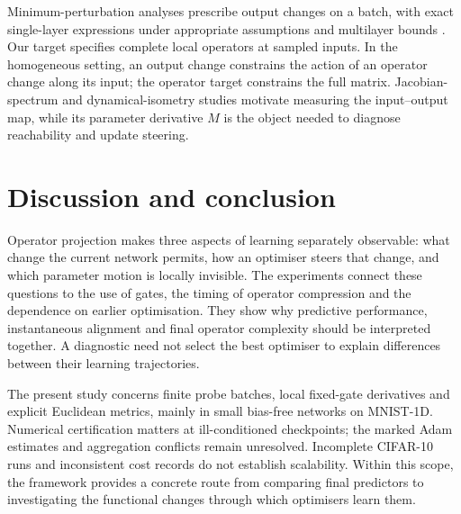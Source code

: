 \documentclass{article}
\theoremstyle{definition}
\theoremstyle{remark}
\begin{document}
Minimum-perturbation analyses prescribe output changes on a batch, with exact single-layer expressions under appropriate assumptions and multilayer bounds \citep{evans2026theory}. Our target specifies complete local operators at sampled inputs. In the homogeneous setting, an output change constrains the action of an operator change along its input; the operator target constrains the full matrix. Jacobian-spectrum and dynamical-isometry studies \citep{wang2016extended,pennington2017resurrecting} motivate measuring the input--output map, while its parameter derivative $M$ is the object needed to diagnose reachability and update steering.

\section{Discussion and conclusion}
\label{sec:conclusion}

Operator projection makes three aspects of learning separately observable: what change the current network permits, how an optimiser steers that change, and which parameter motion is locally invisible. The experiments connect these questions to the use of gates, the timing of operator compression and the dependence on earlier optimisation. They show why predictive performance, instantaneous alignment and final operator complexity should be interpreted together. A diagnostic need not select the best optimiser to explain differences between their learning trajectories.

The present study concerns finite probe batches, local fixed-gate derivatives and explicit Euclidean metrics, mainly in small bias-free networks on MNIST-1D. Numerical certification matters at ill-conditioned checkpoints; the marked Adam estimates and aggregation conflicts remain unresolved. Incomplete CIFAR-10 runs and inconsistent cost records do not establish scalability. Within this scope, the framework provides a concrete route from comparing final predictors to investigating the functional changes through which optimisers learn them.

\clearpage
\end{document}
